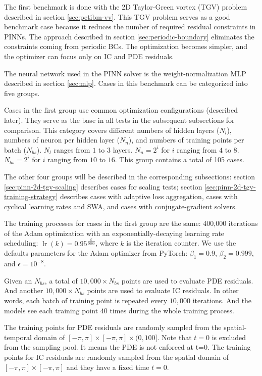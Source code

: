 
The first benchmark is done with the 2D Taylor-Green vortex (TGV) problem described in section \ref{sec:petibm-vv}.
This TGV problem serves as a good benchmark case because it reduces the number of required residual constraints in PINNs.
The approach described in section \ref{sec:periodic-boundary} eliminates the constraints coming from periodic BCs.
The optimization becomes simpler, and the optimizer can focus only on IC and PDE residuals.

The neural network used in the PINN solver is the weight-normalization MLP described in section \ref{sec:mlp}.
Cases in this benchmark can be categorized into five groups.

Cases in the first group use common optimization configurations (described later).
They serve as the base in all tests in the subsequent subsections for comparison.
This category covers different numbers of hidden layers ($N_l$), numbers of neuron per hidden layer ($N_n$), and numbers of training points per batch ($N_{bs}$).
$N_l$ ranges from $1$ to $3$ layers.
$N_n=2^i$ for $i$ ranging from $4$ to $8$.
$N_{bs}=2^i$ for $i$ ranging from $10$ to $16$.
This group contains a total of 105 cases.

The other four groups will be described in the corresponding subsections: section \ref{sec:pinn-2d-tgv-scaling} describes cases for scaling tests; section \ref{sec:pinn-2d-tgv-training-strategy} describes cases with adaptive loss aggregation, cases with cyclical learning rates and SWA, and cases with conjugate-gradient solvers.

The training processes for cases in the first group are the same: 400,000 iterations of the Adam optimization with an exponentially-decaying learning rate scheduling: $\operatorname{lr}(k) = 0.95^\frac{k}{5000}$, where $k$ is the iteration counter.
We use the defaults parameters for the Adam optimizer from PyTorch: $\beta_1=0.9$, $\beta_2=0.999$, and $\epsilon=10^{-8}$.

Given an $N_{bs}$, a total of $10,000 \times N_{bs}$ points are used to evaluate PDE residuals.
And another $10,000 \times N_{bs}$ points are used to evaluate IC residuals.
In other words, each batch of training point is repeated every $10,000$ iterations.
And the models see each training point $40$ times during the whole training process.

The training points for PDE residuals are randomly sampled from the spatial-temporal domain of $[-\pi, \pi]\times[-\pi, \pi]\times(0, 100]$.
Note that $t=0$ is excluded from the sampling pool.
It means the PDE is not enforced at t=0.
The training points for IC residuals are randomly sampled from the spatial domain of $[-\pi, \pi]\times[-\pi, \pi]$ and they have a fixed time $t=0$.

